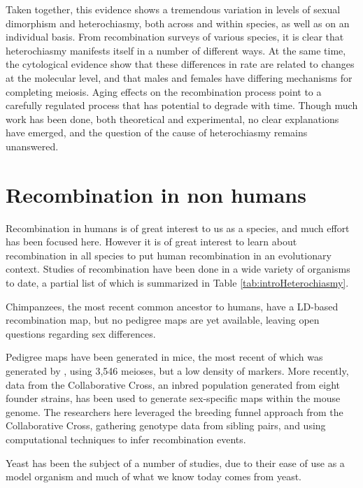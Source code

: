 Taken together, this evidence shows a tremendous variation in levels of sexual dimorphism and heterochiasmy, both across and within species, as well as on an individual basis.
From recombination surveys of various species, it is clear that heterochiasmy manifests itself in a number of different ways.
At the same time, the cytological evidence show that these differences in rate are related to changes at the molecular level, and that males and females have differing mechanisms for completing meiosis.
Aging effects on the recombination process point to a carefully regulated process that has potential to degrade with time.
Though much work has been done, both theoretical and experimental, no clear explanations have emerged, and the question of the cause of heterochiasmy remains unanswered.

\section{Recombination in non humans}


Recombination in humans is of great interest to us as a species, and much effort has been focused here.
However it is of great interest to learn about recombination in all species to put human recombination in an evolutionary context.
Studies of recombination have been done in a wide variety of organisms to date, a partial list of which is summarized in Table \ref{tab:introHeterochiasmy}.

Chimpanzees, the most recent common ancestor to humans, have a LD-based recombination map\cite{Auton2012a}, but no pedigree maps are yet available, leaving open questions regarding sex differences.

Pedigree maps have been generated in mice\cite{Broman2002}, the most recent of which was generated by \citet{Cox2009}, using 3,546 meioses, but a low density of markers.
More recently, data from the Collaborative Cross\cite{CollaborativeCrossConsortium2012}, an inbred population generated from eight founder strains, has been used to generate sex-specific maps within the mouse genome\cite{Liu2014}.
The researchers here leveraged the breeding funnel approach from the Collaborative Cross, gathering genotype data from sibling pairs, and using computational techniques to infer recombination events.


Yeast has been the subject of a number of studies, due to their ease of use as a model organism and much of what we know today comes from yeast.

